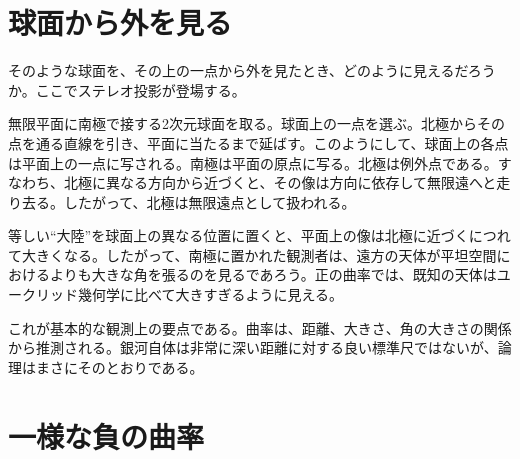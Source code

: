 \section{球面から外を見る}

そのような球面を、その上の一点から外を見たとき、どのように見えるだろうか。ここでステレオ投影が登場する。

無限平面に南極で接する2次元球面を取る。球面上の一点を選ぶ。北極からその点を通る直線を引き、平面に当たるまで延ばす。このようにして、球面上の各点は平面上の一点に写される。南極は平面の原点に写る。北極は例外点である。すなわち、北極に異なる方向から近づくと、その像は方向に依存して無限遠へと走り去る。したがって、北極は無限遠点として扱われる。

等しい``大陸''を球面上の異なる位置に置くと、平面上の像は北極に近づくにつれて大きくなる。したがって、南極に置かれた観測者は、遠方の天体が平坦空間におけるよりも大きな角を張るのを見るであろう。正の曲率では、既知の天体はユークリッド幾何学に比べて大きすぎるように見える。

これが基本的な観測上の要点である。曲率は、距離、大きさ、角の大きさの関係から推測される。銀河自体は非常に深い距離に対する良い標準尺ではないが、論理はまさにそのとおりである。

\begin{classroomqa}
\end{classroomqa}

\begin{classroomqa}
\end{classroomqa}

\begin{classroomqa}
\end{classroomqa}

\section{一様な負の曲率}

